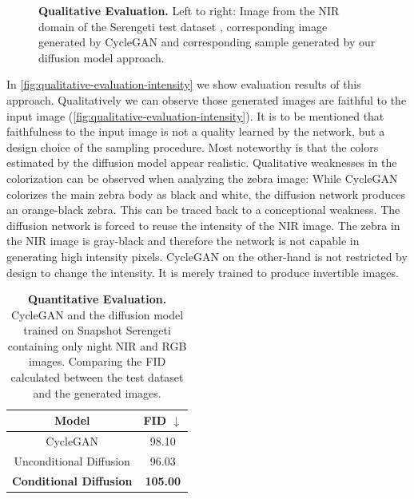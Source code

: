 \begin{figure}[htp!]
\begin{tabularx}{\textwidth}{Y Y Y !{\space} Y Y Y}
    \end{tabularx}
    \caption{
        \textbf{Qualitative Evaluation.} Left to right: Image from the NIR domain of the Serengeti test dataset \parencite{serengeti},
        corresponding image generated by CycleGAN \parencite{mehri} and corresponding sample generated by our diffusion model approach.
    }
    \label{fig:qualitative-evaluation-intensity}
\end{figure}

In \autoref{fig:qualitative-evaluation-intensity} we show evaluation results of this approach.
Qualitatively we can observe those generated images are faithful to the input image (\autoref{fig:qualitative-evaluation-intensity}).
It is to be mentioned that faithfulness to the input image is not a quality learned by the network, but a design choice of the sampling procedure.
Most noteworthy is that the colors estimated by the diffusion model appear realistic.
Qualitative weaknesses in the colorization can be observed when analyzing the zebra image:
While CycleGAN colorizes the main zebra body as black and white, the diffusion network produces an orange-black zebra.
This can be traced back to a conceptional weakness.
The diffusion network is forced to reuse the intensity of the NIR image.
The zebra in the NIR image is gray-black and therefore the network is not capable in generating high intensity pixels.
CycleGAN on the other-hand is not restricted by design to change the intensity.
It is merely trained to produce invertible images.

\begin{table}[htp!]
    \centering
    \begin{tabular}{c | c}
        Model                                           & FID  $\downarrow$ \\
        \hline\hline
        CycleGAN                                        & 98.10             \\
        Unconditional Diffusion                         & 96.03             \\
        \textbf{Conditional Diffusion} \parencite{sbgm} & \textbf{105.00}
    \end{tabular}
    \caption{
        \textbf{Quantitative Evaluation.} CycleGAN and the diffusion model trained on Snapshot Serengeti \parencite{serengeti} containing only night NIR and RGB images.
        Comparing the FID calculated between the test dataset and the generated images.
    }
    \label{fig:qualitative-evaluation-full-high-pass}
\end{table}


